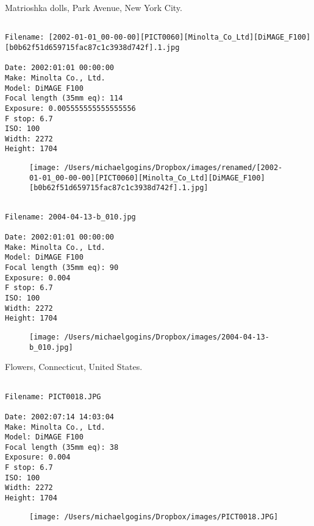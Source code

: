 \documentclass[11pt,letter,DIV=14,paper=landscape]{scrbook}
\begin{document}
\clearpage
\noindent Matrioshka dolls, Park Avenue, New York City.
\noindent
\begin{lstlisting}

Filename: [2002-01-01_00-00-00][PICT0060][Minolta_Co_Ltd][DiMAGE_F100][b0b62f51d659715fac87c1c3938d742f].1.jpg

Date: 2002:01:01 00:00:00
Make: Minolta Co., Ltd.
Model: DiMAGE F100
Focal length (35mm eq): 114
Exposure: 0.005555555555555556
F stop: 6.7
ISO: 100
Width: 2272
Height: 1704
\end{lstlisting}
\clearpage

\begin{figure}
\texttt{[image: /Users/michaelgogins/Dropbox/images/renamed/[2002-01-01\_00-00-00][PICT0060][Minolta\_Co\_Ltd][DiMAGE\_F100][b0b62f51d659715fac87c1c3938d742f].1.jpg]}
\end{figure}
    
\clearpage
\noindent 
\noindent
\begin{lstlisting}

Filename: 2004-04-13-b_010.jpg

Date: 2002:01:01 00:00:00
Make: Minolta Co., Ltd.
Model: DiMAGE F100
Focal length (35mm eq): 90
Exposure: 0.004
F stop: 6.7
ISO: 100
Width: 2272
Height: 1704
\end{lstlisting}
\clearpage

\begin{figure}
\texttt{[image: /Users/michaelgogins/Dropbox/images/2004-04-13-b\_010.jpg]}
\end{figure}
    
\clearpage
\noindent Flowers, Connecticut, United States.
\noindent
\begin{lstlisting}

Filename: PICT0018.JPG

Date: 2002:07:14 14:03:04
Make: Minolta Co., Ltd.
Model: DiMAGE F100
Focal length (35mm eq): 38
Exposure: 0.004
F stop: 6.7
ISO: 100
Width: 2272
Height: 1704
\end{lstlisting}
\clearpage

\begin{figure}
\texttt{[image: /Users/michaelgogins/Dropbox/images/PICT0018.JPG]}
\end{figure}
    
\end{document}
